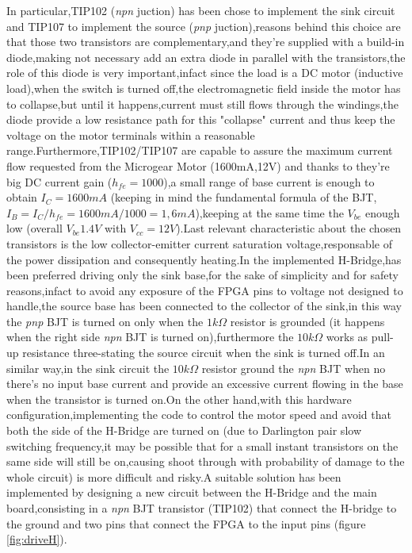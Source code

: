 In particular,TIP102 (\emph{npn} juction) has been chose to implement the sink circuit and TIP107 to implement the source (\emph{pnp} juction),reasons behind this choice are that those two transistors are complementary,and they're supplied with a build-in diode,making not necessary add an extra diode in parallel with the transistors,the role of this diode is very important,infact since the load is a DC motor (inductive load),when the switch is turned off,the electromagnetic field inside the motor has to collapse,but until it happens,current must still flows through the windings,the diode provide a low resistance path for this "collapse" current and thus keep the voltage on the motor terminals within a  reasonable range.Furthermore,TIP102/TIP107 are capable to assure the maximum current flow requested from the Microgear Motor (1600mA,12V) and thanks to they're big DC current gain ($h_{fe}=1000$),a small range of base current is enough to obtain $I_C=1600mA$ (keeping in mind the fundamental formula of the BJT,$I_B=I_C/h_{fe}=1600mA/1000=1,6mA$),keeping at the same time the $V_{be}$ enough low (overall $V_{be}1.4 V$ with $V_{cc}=12 V$).Last relevant characteristic about the chosen transistors is the low collector-emitter current saturation voltage,responsable of the power dissipation and consequently heating.In the implemented H-Bridge,has been preferred driving only the sink base,for the sake of simplicity and for safety reasons,infact to avoid any exposure of the FPGA pins to voltage not designed to handle,the source base has been connected to the collector of the sink,in this way the \emph{pnp} BJT is turned on only when the $ 1k\Omega $ resistor is grounded (it happens when the right side \emph{npn} BJT is turned on),furthermore the $ 10k\Omega $ works as pull-up resistance three-stating the source circuit when the sink is turned off.In an similar way,in the sink circuit the $ 10k\Omega $ resistor ground the \emph{npn} BJT when no there's no input base current and provide an excessive current flowing in the base when the transistor is turned on.On the other hand,with this hardware configuration,implementing the code to control the motor speed and avoid that both the side of the H-Bridge are turned on (due to Darlington pair slow switching frequency,it may be possible that for a small instant transistors on the same side will still be on,causing shoot through with probability of damage to the whole circuit) is more difficult and risky.A suitable solution has been implemented by designing a new circuit  between the H-Bridge and the main board,consisting in a \emph{npn} BJT transistor (TIP102) that connect the H-bridge to the ground and two pins that connect the FPGA to the input pins (figure  \ref{fig:driveH}).


